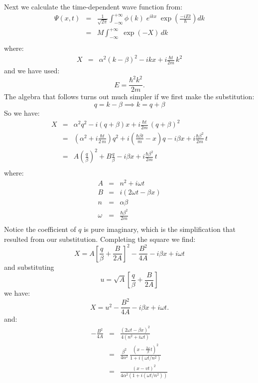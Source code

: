 \documentclass[12pt]{article}
\begin{document}
Next we calculate the time-dependent wave function from:
\begin{eqnarray*}
  \Psi(x,t) &=& \frac{1}{\sqrt{2\pi}}\int_{-\infty}^{+\infty} \phi(k) \; e^{ikx} \; \exp\left(\frac{-iEt}{\hbar}\right) dk \\
  &=& M \int_{-\infty}^{+\infty} \; \exp(-X) \, dk\\  
\end{eqnarray*}
where:
\begin{eqnarray*}
  X &=& \alpha^2(k-\beta)^2 - ikx + i \frac{\hbar t}{2 m}\,k^2
\end{eqnarray*}
and we have used:
$$E = \frac{\hbar^2 k^2}{2 m}.$$
The algebra that follows turns out much simpler if we first make the substitution:
$$q = k - \beta \implies k = q + \beta$$
So we have:
\begin{eqnarray*}
  X &=& \alpha^2 q^2 - i(q+\beta)x + i \frac{\hbar t}{2 m}\,(q+\beta)^2\\
  &=& \left(\alpha^2 + i \frac{\hbar t}{2 \, m}\right) q^2 + i(\frac{\hbar \beta t}{m}-x)q - i\beta x + i\frac{\hbar \beta^2}{2 m}\,t\\
  &=& A \left( \frac{q}{\beta} \right)^2 + B \frac{q}{\beta} - i\beta x + i \frac{\hbar \beta^2}{2 m}\,t\\  
\end{eqnarray*}
where:
\begin{eqnarray*}
  A &=& n^2 + i \omega t \\
  B &=& i (2 \omega t - \beta x) \\
  n &=& \alpha \beta \\
  \omega &=& \frac{\hbar \beta^2}{2m}\\ 
\end{eqnarray*}
Notice the coefficient of $q$ is pure imaginary, which is the
simplification that resulted from our substitution.  Completing the square we find:
\begin{equation*}
X = A \left[ \frac{q}{\beta} + \frac{B}{2A} \right]^2 - \frac{B^2}{4A}-i\beta x+i \omega t
\end{equation*}
and substituting
$$u = \sqrt{A} \left[\frac{q}{\beta} + \frac{B}{2A}\right]$$
we have:
\begin{equation*}
X = u^2 - \frac{B^2}{4A}-i\beta x+i \omega t.
\end{equation*}
and:
\begin{eqnarray*}
-\frac{B^2}{4A} &=& \frac{(2 \omega t - \beta x)^2 }{4 (n^2+i\omega t)} \\[5pt]
&=& \frac{\beta^2}{4 n^2} \, \frac{(x - \frac{2 \omega}{\beta} t)^2}{1 + i (\omega t / n^2)}\\
&=& \frac{(x - v t)^2}{4 \alpha^2 (1 + i (\omega t / n^2))}\\
\end{eqnarray*}
\end{document}
